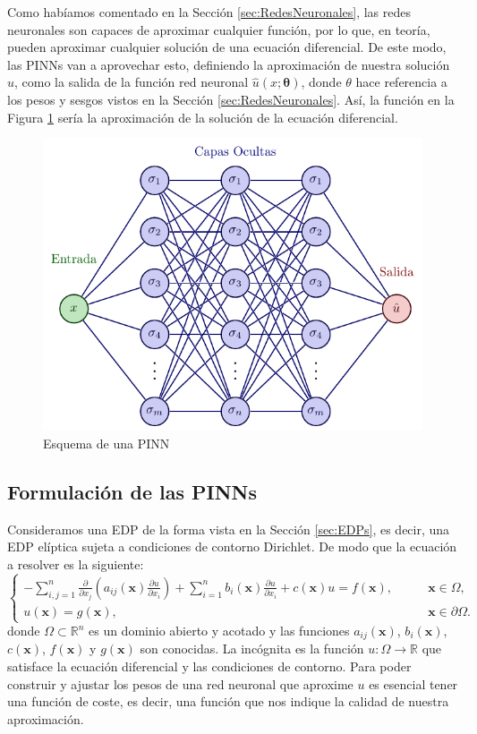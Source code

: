 \documentclass[a4paper,11pt,spanish, twoside, leqno]{tfg-uam}
\theoremstyle{definition}
\begin{document}
Como habíamos comentado en la Sección \ref{sec:RedesNeuronales}, las redes neuronales son capaces de aproximar cualquier función, por lo que, en teoría, pueden aproximar cualquier solución de una ecuación diferencial. De este modo, las PINNs van a aprovechar esto, definiendo la aproximación de nuestra solución ${u}$, como la salida de la función red neuronal $\hat{u}(x;\mathbf{\theta})$,  donde $\theta$ hace referencia a los pesos y sesgos vistos en la Sección \ref{sec:RedesNeuronales}. Así, la función en la Figura \ref{fig:PIN} sería la aproximación de la solución de la ecuación diferencial.
\begin{figure}[htbp]
    \centering
    \includegraphics[scale=0.6]{Figuras/neural_network_improved.pdf}
    \caption{Esquema de una PINN}
    \label{fig:PIN}
\end{figure}

\subsection{Formulación de las PINNs}
Consideramos una EDP de la forma vista en la Sección \ref{sec:EDPs}, es decir, una EDP elíptica sujeta a condiciones de contorno Dirichlet. De modo que la ecuación a resolver es la siguiente: 
\begin{equation} 
    \begin{cases} -\sum_{i,j=1}^{n} \frac{\partial}{\partial x_j}\left( a_{ij}(\mathbf{x})\frac{\partial u}{\partial x_i}\right) + \sum_{i=1}^{n} b_i(\mathbf{x})\frac{\partial u}{\partial x_i} + c(\mathbf{x})u = f(\mathbf{x}), &\qquad \mathbf{x}\in\Omega,\\ u(\mathbf{x}) = g(\mathbf{x}), &\qquad \mathbf{x}\in\partial\Omega. 
    \end{cases} 
\end{equation} 
donde $\Omega \subset \mathbb{R}^n$ es un dominio abierto y acotado y las funciones $a_{ij}(\mathbf{x})$, $b_i(\mathbf{x})$, $c(\mathbf{x})$, $f(\mathbf{x})$ y $g(\mathbf{x})$ son conocidas. La incógnita es la función $u: \Omega \to \mathbb{R}$ que satisface la ecuación diferencial y las condiciones de contorno. Para poder construir y ajustar los pesos de una red neuronal que aproxime $u$ es esencial tener una función de coste, es decir, una función que nos indique la calidad de nuestra aproximación. 
\end{document}
